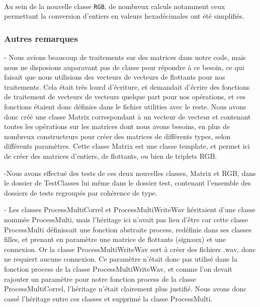 \paragraph{}
Au sein de la nouvelle classe \verb!RGB!, de nombreux calculs notamment ceux permettant la conversion d'entiers en valeurs hexadécimales ont été simplifiés.

\subsubsection{Autres remarques}
  

  - Nous avions beaucoup de traitements sur des matrices dans notre code, mais
  nous ne disposions auparavant pas de classe pour répondre à ce besoin, ce qui
  faisait que nous utilisions des vecteurs de vecteurs de flottants pour nos
  traitements. Cela était très lourd d'écriture, et demandait d'écrire des
  fonctions de traitement de vecteurs de vecteurs quelque part pour nos
  opérations, et ces fonctions étaient donc définies dans le fichier utilities
  avec le reste. Nous avons donc créé une classe Matrix correspondant à un
  vecteur de vecteur et contenant toutes les opérations sur les matrices dont
  nous avons besoins, en plus de nombreux constructeurs pour créer des matrices
  de différents types, selon différents paramètres. Cette classe Matrix est une
  classe template, et permet ici de créer des matrices d'entiers, de flottants,
  ou bien de triplets RGB.

  -Nous avons effectué des tests de ces deux nouvelles classes, Matrix et RGB,
  dans le dossier de TestClasses lui même dans le dossier test, contenant
  l'ensemble des dossiers de tests regroupés par cohérence de type.

  - Les classes ProcessMultiCorrel et ProcessMultiWriteWav héritaient d'une
  classe nommée ProcessMulti, mais l'héritage ici n'avait pas lieu d'être car
  cette classe ProcessMulti définissait une fonction abstraite process,
  redéfinie dans ses classes filles, et prenant en paramètre une matrice de
  flottants (signaux) et une connexion. Or la classe ProcessMultiWriteWav sert
  à créer des fichiers .wav, donc ne requiert aucune connexion. Ce paramètre
  n'était donc pas utilisé dans la fonction process de la classe
  ProcessMultiWriteWav, et comme l'on devait rajouter un paramètre pour notre
  fonction process de la classe ProcessMultiCorrel, l'héritage n'était
  clairement plus justifié. Nous avons donc cassé l'héritage entre ces classes
  et supprimé la classe ProcessMulti.

